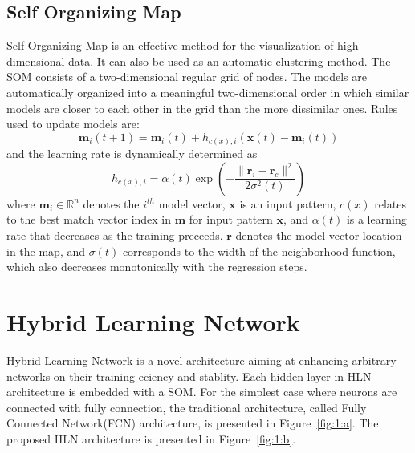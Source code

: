 \documentclass[3p,times,procedia]{elsarticle}
\begin{document}
\subsection{Self Organizing Map}
Self Organizing Map is an effective 
method for the visualization of 
high-dimensional data. 
It can also be used 
as an automatic clustering method. 
The SOM consists of a two-dimensional 
regular grid of nodes. 
The models are automatically 
organized into a meaningful 
two-dimensional order in which 
similar models are closer to
each other in the grid than 
the more dissimilar
ones\cite{kohonen1998self}.
Rules used to update models are:
\begin{equation}
	\mathbf{m}_i(t+1)=\mathbf{m}_i(t)+
	h_{c(x),i}\left(
	\mathbf{x}(t)-\mathbf{m}_i(t)
	\right)
	\label{eq:8}
\end{equation}
and the learning rate is 
dynamically determined as
\begin{equation}
	h_{c(x),i} = \alpha(t)\exp\left(
	-\frac{\|\mathbf{r}_i-\mathbf{r}_c\|^2}
	{2\sigma^2(t)}
	\right)
	\label{eq:9}
\end{equation}
where $\mathbf{m}_i\in\mathbb{R}^n$ 
denotes the $i^{th}$ model vector, 
$\mathbf{x}$ is an input pattern,
$c(x)$ relates to the best match 
vector index
in $\mathbf{m}$ for input 
pattern $\mathbf{x}$,
and $\alpha(t)$ is a learning rate 
that decreases as the
training preceeds.
$\mathbf{r}$ denotes the model vector 
location in 
the map, and $\sigma(t)$ 
corresponds to the 
width of the neighborhood 
function, which 
also decreases monotonically 
with the regression steps.

\section{Hybrid Learning Network}
Hybrid Learning Network is a novel
architecture aiming at 
enhancing arbitrary networks
on their training eciency and
stablity.
Each hidden layer in HLN architecture 
is embedded with a SOM. For the 
simplest case where neurons are connected 
with fully connection, the traditional
architecture, called Fully 
Connected Network(FCN) architecture,
is presented in Figure~\ref{fig:1:a}.
The proposed HLN architecture is
presented in Figure~\ref{fig:1:b}.
\end{document}
